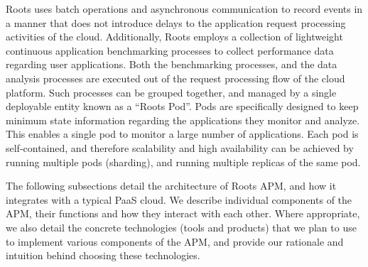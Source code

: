 Roots uses batch operations and asynchronous 
communication to record events in a manner that does not introduce
delays to the application request processing activities of the 
cloud. 
Additionally, Roots employs a collection of lightweight continuous application benchmarking
processes to collect performance data regarding user applications. Both
the benchmarking processes, and the data analysis processes are executed 
out of the request processing flow of the cloud platform. Such processes can be
grouped together, and managed by a single deployable entity known as a
``Roots Pod''. Pods are specifically designed to keep minimum state
information regarding the applications they monitor and analyze. This enables
a single pod to monitor a large number of applications. Each pod is self-contained,
and therefore scalability and high availability can be achieved by running multiple pods (sharding),
and running multiple replicas of the same pod.

The following subsections detail the architecture of Roots APM, and how it integrates with a typical PaaS
cloud. We describe individual components of the APM, their functions and how they interact with each
other. Where appropriate, we also detail the concrete technologies (tools and products) that we plan to use to implement
various components of the APM, and provide our rationale and intuition behind choosing these technologies.
